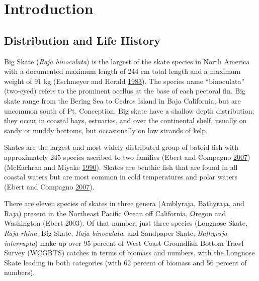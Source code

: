\documentclass[12pt,]{article}
\begin{document}
\FloatBarrier

\newpage
\renewcommand{\thefigure}{\arabic{figure}}
\renewcommand{\thetable}{\arabic{table}}
\setcounter{figure}{0}
\setcounter{table}{0}

\newpage
\renewcommand{\thefigure}{\arabic{figure}}
\renewcommand{\thetable}{\arabic{table}}
\setcounter{figure}{0}
\setcounter{table}{0}

\hypertarget{introduction}{%
\section{Introduction}\label{introduction}}

\hypertarget{distribution-and-life-history}{%
\subsection{Distribution and Life
History}\label{distribution-and-life-history}}

Big Skate (\emph{Raja binoculata}) is the largest of the skate species
in North America with a documented maximum length of 244 cm total length
and a maximum weight of 91 kg (Eschmeyer and Herald
\protect\hyperlink{ref-Eschmeyer1983}{1983}). The species name
``binoculata'' (two-eyed) refers to the prominent ocellus at the base of
each pectoral fin. Big skate range from the Bering Sea to Cedros Island
in Baja California, but are uncommon south of Pt. Conception. Big skate
have a shallow depth distribution; they occur in coastal bays,
estuaries, and over the continental shelf, usually on sandy or muddy
bottoms, but occasionally on low strands of kelp.

Skates are the largest and most widely distributed group of batoid fish
with approximately 245 species ascribed to two families (Ebert and
Compagno \protect\hyperlink{ref-Ebert2007}{2007})(McEachran and Miyake
\protect\hyperlink{ref-McEachran1990}{1990}). Skates are benthic fish
that are found in all coastal waters but are most common in cold
temperatures and polar waters (Ebert and Compagno
\protect\hyperlink{ref-Ebert2007}{2007}).

There are eleven species of skates in three genera (Amblyraja,
Bathyraja, and Raja) present in the Northeast Pacific Ocean off
California, Oregon and Washington (Ebert 2003). Of that number, just
three species (Longnose Skate, \emph{Raja rhina}; Big Skate, \emph{Raja
binoculata}; and Sandpaper Skate, \emph{Bathyraja interrupta}) make up
over 95 percent of West Coast Groundfish Bottom Trawl Survey (WCGBTS)
catches in terms of biomass and numbers, with the Longnose Skate leading
in both categories (with 62 percent of biomass and 56 percent of
numbers).
\end{document}
